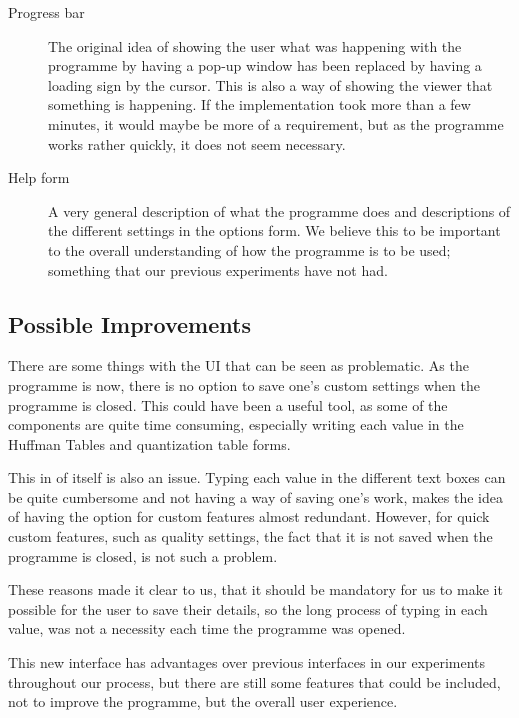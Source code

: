 \begin{description}
\item[Progress bar]
The original idea of showing the user what was happening with the programme by having a pop-up window has been replaced by having a loading sign by the cursor.
This is also a way of showing the viewer that something is happening.
If the implementation took more than a few minutes, it would maybe be more of a requirement, but as the programme works rather quickly, it does not seem necessary.

\item[Help form]
A very general description of what the programme does and descriptions of the different settings in the options form.
We believe this to be important to the overall understanding of how the programme is to be used; something that our previous experiments have not had.
\end{description}

\subsection{Possible Improvements}
There are some things with the UI that can be seen as problematic.
As the programme is now, there is no option to save one's custom settings when the programme is closed.
This could have been a useful tool, as some of the components are quite time consuming, especially writing each value in the Huffman Tables and quantization table forms.

This in of itself is also an issue.
Typing each value in the different text boxes can be quite cumbersome and not having a way of saving one's work, makes the idea of having the option for custom features almost redundant.
However, for quick custom features, such as quality settings, the fact that it is not saved when the programme is closed, is not such a problem.

These reasons made it clear to us, that it should be mandatory for us to make it possible for the user to save their details, so the long process of typing in each value, was not a necessity each time the programme was opened.

This new interface has advantages over previous interfaces in our experiments throughout our process, but there are still some features that could be included, not to improve the programme, but the overall user experience.


